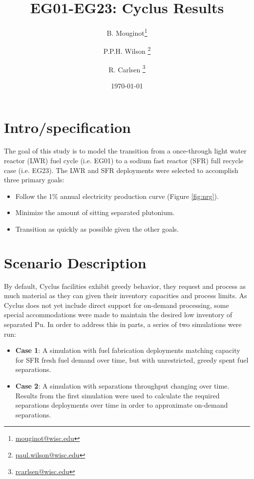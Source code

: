 \documentclass[12pt]{article}
\title{EG01-EG23: Cyclus Results}
\author[1]{B. Mouginot\thanks{\href{mailto:mouginot@wisc.edu}{mouginot@wisc.edu}}}
\author[1]{P.P.H. Wilson \thanks{\href{mailto:paul.wilson@wisc.edu}{paul.wilson@wisc.edu}}}
\author[1]{R. Carlsen \thanks{\href{mailto:rcarlsen@wisc.edu}{rcarlsen@wisc.edu}}}
\affil[1]{University of Wisconsin--Madison, Department of Engineering Physics, CNERG group}
\date{\today}
\begin{document}
\maketitle

\section{Intro/specification}

The goal of this study is to model the transition from a once-through light
water reactor (LWR) fuel cycle (i.e. EG01) to a sodium fast reactor (SFR) full
recycle case (i.e. EG23).   The LWR and SFR deployments were selected to
accomplish three primary goals:

\begin{itemize}
    \item Follow the 1\% annual electricity production curve (Figure \ref{fig:nrg}).
    \item Minimize the amount of sitting separated plutonium.
    \item Transition as quickly as possible given the other goals.
\end{itemize}

\section{Scenario Description}

By default, Cyclus facilities exhibit greedy behavior, they request and
process as much material as they can given their inventory capacities and
process limits.  As Cyclus does not yet include direct support for on-demand
processing, some special accommodations were made to maintain the desired low
inventory of separated Pu.  In order to address this in parts, a series of two
simulations were run:

\begin{itemize}

    \item \textbf{Case 1}: A simulation with fuel fabrication deployments
        matching capacity for SFR fresh fuel demand over time, but with
        unrestricted, greedy spent fuel separations.

    \item \textbf{Case 2}: A simulation with separations throughput changing
        over time. Results from the first simulation were used to calculate
        the required separations deployments over time in order to approximate
        on-demand separations.

\end{itemize}
\end{document}
